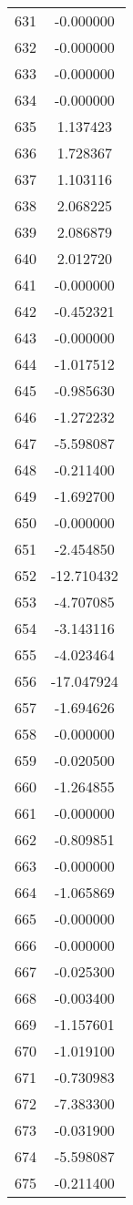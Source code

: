 \documentclass[12pt]{article}
\begin{document}
\begin{longtable}{@{}cc@{}}
631 & -0.000000 \\
632 & -0.000000 \\
633 & -0.000000 \\
634 & -0.000000 \\
635 & 1.137423 \\
636 & 1.728367 \\
637 & 1.103116 \\
638 & 2.068225 \\
639 & 2.086879 \\
640 & 2.012720 \\
641 & -0.000000 \\
642 & -0.452321 \\
643 & -0.000000 \\
644 & -1.017512 \\
645 & -0.985630 \\
646 & -1.272232 \\
647 & -5.598087 \\
648 & -0.211400 \\
649 & -1.692700 \\
650 & -0.000000 \\
651 & -2.454850 \\
652 & -12.710432 \\
653 & -4.707085 \\
654 & -3.143116 \\
655 & -4.023464 \\
656 & -17.047924 \\
657 & -1.694626 \\
658 & -0.000000 \\
659 & -0.020500 \\
660 & -1.264855 \\
661 & -0.000000 \\
662 & -0.809851 \\
663 & -0.000000 \\
664 & -1.065869 \\
665 & -0.000000 \\
666 & -0.000000 \\
667 & -0.025300 \\
668 & -0.003400 \\
669 & -1.157601 \\
670 & -1.019100 \\
671 & -0.730983 \\
672 & -7.383300 \\
673 & -0.031900 \\
674 & -5.598087 \\
675 & -0.211400 \\

\end{longtable}
\end{document}
